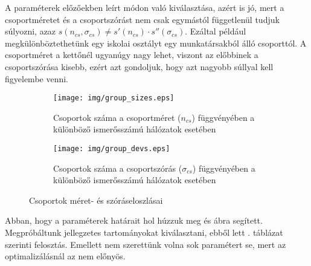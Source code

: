 \documentclass[12pt]{article}
\begin{document}
A paraméterek előzőekben leírt módon való kiválasztása, azért is jó, mert a csoportméretet és a csoportszórást nem csak egymástól függetlenül tudjuk súlyozni, azaz $s(n_{cs}, \sigma_{cs}) \neq s'(n_{cs})\cdot s''(\sigma_{cs})$. Ezáltal például megkülönböztethetünk egy iskolai osztályt egy munkatársakból álló csoporttól. A csoportméret a kettőnél ugyanúgy nagy lehet, viszont az előbbinek a csoportszórása kisebb, ezért azt gondoljuk, hogy azt nagyobb súllyal kell figyelembe venni.
\begin{figure}[H]
	\centering
	\begin{subfigure}{0.49\textwidth}
		\texttt{[image: img/group\_sizes.eps]}
		\caption{Csoportok száma a csoportméret ($n_{cs}$) függvényében a különböző ismerősszámú hálózatok esetében}
		\label{meret_eloszlas}
	\end{subfigure} \hfill
	\begin{subfigure}{0.49\textwidth}
		\texttt{[image: img/group\_devs.eps]}
		\caption{Csoportok száma a csoportszórás ($\sigma_{cs}$) függvényében a különböző ismerősszámú hálózatok esetében}
		\label{szoras_eloszlas}
	\end{subfigure}
	\caption{Csoportok méret- és szóráseloszlásai}
	\label{meret_szoras_eloszlas}
\end{figure}
Abban, hogy a paraméterek határait hol húzzuk meg  és  ábra segített. Megpróbáltunk jellegzetes tartományokat kiválasztani, ebből lett . táblázat szerinti felosztás. Emellett nem szerettünk volna sok paramétert se, mert az optimalizálásnál az nem előnyös.
\end{document}
